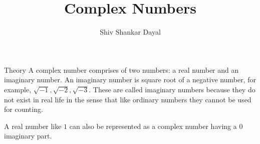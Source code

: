 \documentclass[aspectratio=1610,8pt]{beamer}
\title{Complex Numbers}
\author[Shiv Shankar Dayal]{Shiv Shankar Dayal}
\begin{document}
\begin{frame}
       \titlepage
\end{frame}
\begin{frame}{Theory}
  A complex number comprises of two numbers: a real number and an imaginary number. An imaginary number is square root of a
  negative number, for example, $\sqrt{-1}, \sqrt{-2}, \sqrt{-3}.$ These are called imaginary numbers because they do not exist in
  real life in the sense that like ordinary numbers they cannot be used for counting.

  A real number like $1$ can also be represented as a complex number having a $0$ imaginary part.
\end{frame}
\end{document}
